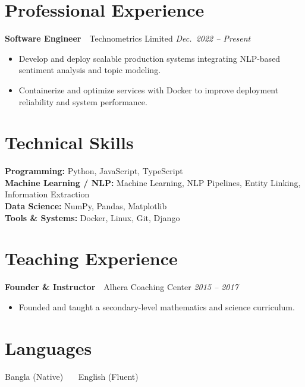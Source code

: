 \documentclass[10pt,a4paper]{article}
\newcommand{\entry}[3]{\textbf{#1}\ \textbar\ #2 \hfill \textit{#3}\par}
\begin{document}
\section{Professional Experience}
\entry{Software Engineer}{Technometrics Limited}{Dec.\ 2022 -- Present}
\begin{itemize}
  \item Develop and deploy scalable production systems integrating NLP-based sentiment analysis and topic modeling.
  \item Containerize and optimize services with Docker to improve deployment reliability and system performance.
\end{itemize}

\section{Technical Skills}
\textbf{Programming:} Python, JavaScript, TypeScript\\
\textbf{Machine Learning / NLP:} Machine Learning, NLP Pipelines, Entity Linking, Information Extraction\\
\textbf{Data Science:} NumPy, Pandas, Matplotlib\\
\textbf{Tools \& Systems:} Docker, Linux, Git, Django

\section{Teaching Experience}
\entry{Founder \& Instructor}{Alhera Coaching Center}{2015 -- 2017}
\begin{itemize}
  \item Founded and taught a secondary-level mathematics and science curriculum.
\end{itemize}

\section{Languages}
Bangla (Native) \ \textbullet\ \ English (Fluent)
\end{document}
